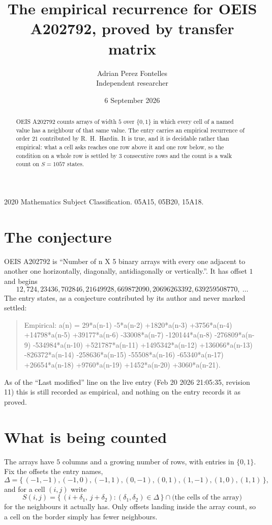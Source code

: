 \documentclass[11pt,a4paper]{article}
\title{The empirical recurrence for OEIS A202792, proved by transfer matrix}
\author{Adrian Perez Fontelles\\ \small Independent researcher}
\date{6 September 2026}
\theoremstyle{plain}
\theoremstyle{definition}
\begin{document}
\maketitle

\begin{abstract}
OEIS A202792 counts arrays of width $5$ over $\{0,1\}$ in which every cell of a named value has a neighbour of that same value. The entry carries an
empirical recurrence of order $21$ contributed by R.~H.~Hardin. It is true, and it is
decidable rather than empirical: what a cell asks reaches one row above it and one row below, so the
condition on a whole row is settled by $3$ consecutive rows and the count is a walk
count on $S=1057$ states.
\end{abstract}

\noindent\small 2020 Mathematics Subject Classification. 05A15, 05B20, 15A18.\normalsize

\section{The conjecture}

OEIS A202792 is ``Number of n X 5 binary arrays with every one adjacent to another one horizontally, diagonally, antidiagonally or vertically.''. It has offset $1$ and begins
\[
12, 724, 23436, 702846, 21649928, 669872090, 20696263392, 639259508770,\ \dots
\]
The entry states, as a conjecture contributed by its author and never marked settled:
\begin{quote}
Empirical: a(n) = 29*a(n-1) -5*a(n-2) +1820*a(n-3) +3756*a(n-4) +14798*a(n-5) +39177*a(n-6) -33008*a(n-7) -120144*a(n-8) -276809*a(n-9) -534984*a(n-10) +521787*a(n-11) +1495342*a(n-12) +136066*a(n-13) -826372*a(n-14) -258636*a(n-15) -55508*a(n-16) -65340*a(n-17) +26654*a(n-18) +9760*a(n-19) +1452*a(n-20) +3060*a(n-21).
\end{quote}
As of the ``Last modified'' line on the live entry (Feb 20 2026 21:05:35, revision 11) this is still
recorded as empirical, and nothing on the entry records it as proved.

\section{What is being counted}

The arrays have $5$ columns and a growing number of rows, with entries in $\{0,1\}$. Fix the
offsets the entry names,
\[
\Delta=\{\,(-1,-1), (-1,0), (-1,1), (0,-1), (0,1), (1,-1), (1,0), (1,1)\,\},
\]
and for a cell $(i,j)$ write
\[
S(i,j)=\{\,(i+\delta_1,\,j+\delta_2) : (\delta_1,\delta_2)\in\Delta\,\}\cap
\text{(the cells of the array)}
\]
for the neighbours it actually has. Only offsets landing inside the array count, so a cell on
the border simply has fewer neighbours.
\end{document}
